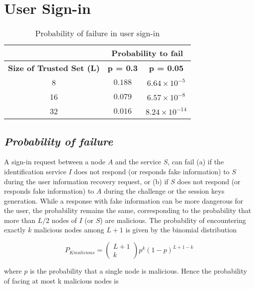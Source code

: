 \section{User Sign-in}
\label{sec:eval_sign_in}
  \begin{table}
    \centering
    \footnotesize
    \begin{tabular}{|c|c|c|}
      \cline{2-3}
      \multicolumn{1}{c|}{}&  \multicolumn{2}{c|}{\textbf{Probability to fail}} \\ \cline{2-3}
      \hline
      \textbf{Size of Trusted Set (L)} & \textbf{p = 0.3} & \textbf{p = 0.05} \\
      \hline \hline
      8 &  $0.188$ & $6.64 \times 10^{-5}$ \\
      \hline
      16 & $0.079$ & $6.57 \times 10^{-8}$  \\
      \hline
      32 & $0.016$ & $8.24 \times 10^{-14}$  \\
      \hline
    \end{tabular}
    \caption{Probability of failure in user sign-in}
    \label{tab:p_sign_in}
  \end{table}
  
  \subsection{\textit{Probability of failure}}
    A sign-in request between a node $A$ and the service $S$, can fail (a) if the identification service $I$ does
not respond (or responds fake information) to $S$ during the user information recovery
request, or (b) if $S$ does not respond (or responds fake information) to $A$
during the challenge or the session keys generation. While a response with fake information can be more dangerous for the
user, the probability remains the same, corresponding to the
probability that more than $L/2$ nodes of $I$ (or $S$) are malicious. The probability of
encountering exactly $k$ malicious nodes among $L +1$ is given by the binomial
distribution

    \begin{equation}
      P_{K malicious} = \begin{pmatrix} L+1 \\ k\end{pmatrix} p^k (1-p)^{L+1-k}
    \end{equation}

    where $p$ is the probability that a single node is malicious. Hence the
probability of facing at most k malicious nodes is 

